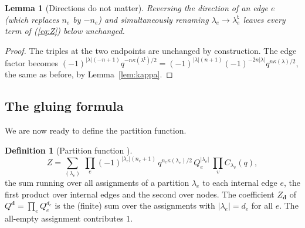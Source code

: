 \documentclass[11pt]{article}
\theoremstyle{plain}
\newtheorem{lemma}[theorem]{Lemma}
\theoremstyle{definition}
\newtheorem{definition}[theorem]{Definition}
\theoremstyle{remark}
\newcommand{\es}{\varnothing}
\newcommand{\tr}{{\mathsf t}}
\newcommand{\lt}[1]{#1^{\tr}}
\begin{document}
\begin{center}
\qquad\qquad
{}
\end{center}

\begin{lemma}[Directions do not matter]\label{lem:direction}
Reversing the direction of an edge $e$ (which replaces $n_e$ by $-n_e$) and simultaneously
renaming $\lambda_e\rightarrow\lt\lambda_e$ leaves every term of (\ref{eq:Z}) below unchanged.
\end{lemma}
\begin{proof}
The triples at the two endpoints are unchanged by construction. The edge factor becomes
$(-1)^{|\lambda|(-n+1)}q^{-n\kappa(\lt\lambda)/2}=(-1)^{|\lambda|(n+1)}(-1)^{-2n|\lambda|}
q^{n\kappa(\lambda)/2}$, the same as before, by Lemma~\ref{lem:kappa}.
\end{proof}

\subsection{The gluing formula}\label{ssec:gluing}

We are now ready to define the partition function.

\begin{definition}[Partition function {\cite[(4), Def.~2.3]{Kon}}]\label{def:Z}
\begin{equation}\label{eq:Z}
Z=\sum_{(\lambda_e)}\ \prod_{e}(-1)^{|\lambda_e|(n_e+1)}\,q^{n_e\kappa(\lambda_e)/2}\,
Q_e^{|\lambda_e|}\ \prod_{v}C_{\lambda_v}(q),
\end{equation}
the sum running over all assignments of a partition $\lambda_e$ to each internal edge $e$, the
first product over internal edges and the second over nodes. The coefficient
$Z_{\mathbf d}$ of $Q^{\mathbf d}=\prod_eQ_e^{d_e}$ is the (finite) sum over the assignments with
$|\lambda_e|=d_e$ for all $e$. The all-empty assignment contributes $1$.
\end{definition}
\end{document}
